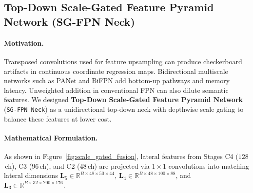 \subsection{Top-Down Scale-Gated Feature Pyramid Network (SG-FPN Neck)}
\label{sec:neck_architecture}

\paragraph{Motivation.}
Transposed convolutions used for feature upsampling can produce checkerboard artifacts in continuous coordinate regression maps. Bidirectional multiscale networks such as PANet and BiFPN add bottom-up pathways and memory latency. Unweighted addition in conventional FPN can also dilute semantic features. We designed \textbf{Top-Down Scale-Gated Feature Pyramid Network} (\texttt{SG-FPN Neck}) as a unidirectional top-down neck with depthwise scale gating to balance these features at lower cost.

\par\vspace{0.5\baselineskip}
\noindent\begin{minipage}{\columnwidth}
    \centering
    \label{fig:scale_gated_fusion}
\end{minipage}
\par


\paragraph{Mathematical Formulation.}
As shown in Figure~\ref{fig:scale_gated_fusion}, lateral features from Stages C4 ($128$\,ch), C3 ($96$\,ch), and C2 ($48$\,ch) are projected via $1 \times 1$ convolutions into matching lateral dimensions $\mathbf{L}_5 \in \mathbb{R}^{B \times 48 \times 50 \times 44}$, $\mathbf{L}_4 \in \mathbb{R}^{B \times 48 \times 100 \times 88}$, and $\mathbf{L}_3 \in \mathbb{R}^{B \times 32 \times 200 \times 176}$.

